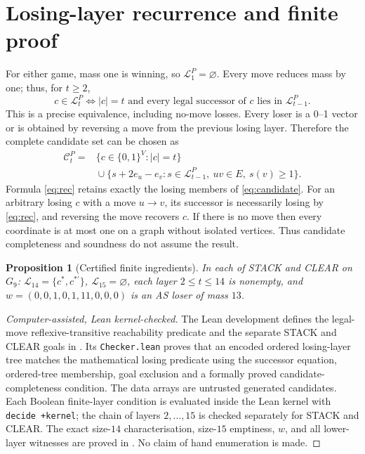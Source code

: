 \documentclass[11pt,a4paper]{article}
\newtheorem{proposition}[theorem]{Proposition}
\begin{document}
\section{Losing-layer recurrence and finite proof}
For either game, mass one is winning, so \(\mathcal{L}_1^P=\varnothing\). Every move reduces mass by one; thus, for \(t\ge2\),
\begin{equation}\label{eq:rec}
c\in\mathcal{L}_t^P\iff |c|=t\text{ and every legal successor of }c\text{ lies in }\mathcal{L}_{t-1}^P.
\end{equation}
This is a precise equivalence, including no-move losses. Every loser is a 0--1 vector or is obtained by reversing a move from the previous losing layer. Therefore the complete candidate set can be chosen as
\begin{equation}\label{eq:candidate}
\begin{aligned}
\mathcal C_t^P={}&\{c\in\{0,1\}^{V}:|c|=t\}\\
&{}\cup\{s+2e_u-e_v:s\in\mathcal L_{t-1}^P,\ uv\in E,\ s(v)\ge1\}.
\end{aligned}
\end{equation}
Formula \eqref{eq:rec} retains exactly the losing members of \eqref{eq:candidate}. For an arbitrary losing \(c\) with a move \(u\to v\), its successor is necessarily losing by \eqref{eq:rec}, and reversing the move recovers \(c\). If there is no move then every coordinate is at most one on a graph without isolated vertices. Thus candidate completeness and soundness do not assume the result.
\begin{proposition}[Certified finite ingredients]\label{prop:cert}
In each of STACK and CLEAR on \(G_9\):
\(\mathcal L_{14}=\{c^*,c^{*\prime}\}\), \(\mathcal L_{15}=\varnothing\),
each layer \(2\le t\le14\) is nonempty, and
\(w=(0,0,1,0,1,11,0,0,0)\) is an AS loser of mass \(13\).
\end{proposition}
\begin{proof}[Computer-assisted, Lean kernel-checked]
The Lean development defines the legal-move reflexive-transitive reachability predicate and the separate STACK and CLEAR goals in . Its \texttt{Checker.lean} proves that an encoded ordered losing-layer tree matches the mathematical losing predicate using the successor equation, ordered-tree membership, goal exclusion and a formally proved candidate-completeness condition. The data arrays are untrusted generated candidates. Each Boolean finite-layer condition is evaluated inside the Lean kernel with \texttt{decide +kernel}; the chain of layers \(2,\ldots,15\) is checked separately for STACK and CLEAR. The exact size-\(14\) characterisation, size-\(15\) emptiness, \(w\), and all lower-layer witnesses are proved in . No claim of hand enumeration is made.
\end{proof}
\end{document}
